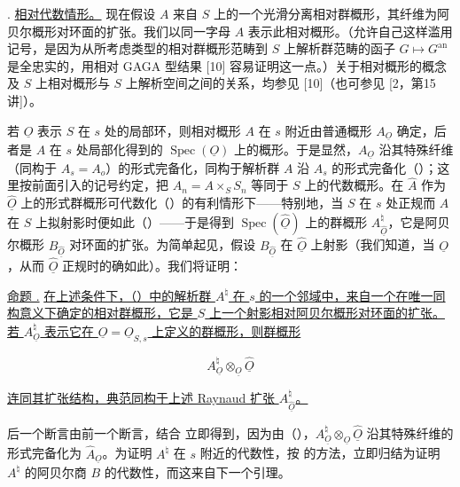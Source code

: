 
\medskip
\noindent
{}. \underline{相对代数情形。}
现在假设 $A$ 来自 $S$ 上的一个光滑分离相对群概形，其纤维为阿贝尔概形对环面的扩张。我们以同一字母 $A$ 表示此相对概形。（允许自己这样滥用记号，是因为从所考虑类型的相对群概形范畴到 $S$ 上解析群范畴的函子 $G\longmapsto G^{\mathrm{an}}$ 是全忠实的，用相对 GAGA 型结果 [10] 容易证明这一点。）关于相对概形的概念及 $S$ 上相对概形与 $S$ 上解析空间之间的关系，均参见 [10]（也可参见 [2，第15讲]）。

若 $\underline O$ 表示 $S$ 在 $s$ 处的局部环，则相对概形 $A$ 在 $s$ 附近由普通概形 $A_{\underline O}$ 确定，后者是 $A$ 在 $s$ 处局部化得到的 $\operatorname{Spec}(\underline O)$ 上的概形。于是显然，$A_{\underline O}$ 沿其特殊纤维（同构于 $A_s=A_o$）的形式完备化，同构于解析群 $A$ 沿 $A_s$ 的形式完备化（）；这里按前面引入的记号约定，把 $A_n=A\times_S S_n$ 等同于 $S$ 上的代数概形。在 $\hat A$ 作为 $\hat{\underline O}$ 上的形式群概形可代数化（）的有利情形下——特别地，当 $S$ 在 $s$ 处正规而 $A$ 在 $S$ 上拟射影时便如此（）——于是得到 $\operatorname{Spec}(\hat{\underline O})$ 上的群概形 $A^{\natural}_{\hat{\underline O}}$，它是阿贝尔概形 $B_{\hat{\underline O}}$ 对环面的扩张。为简单起见，假设 $B_{\hat{\underline O}}$ 在 $\hat{\underline O}$ 上射影（我们知道，当 $\underline O$，从而 $\hat{\underline O}$ 正规时的确如此）。我们将证明：

\medskip
\noindent
\underline{命题 .} \underline{在上述条件下，（）中的解析群 $A^{\natural}$ 在 $s$ 的一个邻域中，来自一个在唯一同构意义下确定的相对群概形，它是 $S$ 上一个射影相对阿贝尔概形对环面的扩张。若 $A^{\natural}_{\underline O}$ 表示它在 $\underline O=\underline O_{S,s}$ 上定义的群概形，则群概形}

\begin{equation*}
 A^{\natural}_{\underline O}\otimes_{\underline O}
 \hat{\underline O}
\end{equation*}

\noindent
\underline{连同其扩张结构，典范同构于上述 Raynaud 扩张 $A^{\natural}_{\hat{\underline O}}$。}

后一个断言由前一个断言，结合  立即得到，因为由（），$A^{\natural}_{\underline O}\otimes_{\underline O}\hat{\underline O}$ 沿其特殊纤维的形式完备化为 $\hat A_{\underline O}$。为证明 $A^{\natural}$ 在 $s$ 附近的代数性，按  的方法，立即归结为证明 $A^{\natural}$ 的阿贝尔商 $B$ 的代数性，而这来自下一个引理。

